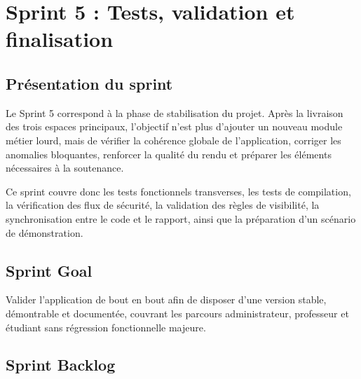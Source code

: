 \documentclass[12pt,a4paper]{report}
\begin{document}
\chapter{Sprint 5 : Tests, validation et finalisation}

\section{Présentation du sprint}

Le Sprint 5 correspond à la phase de stabilisation du projet. Après la livraison des trois espaces principaux, l'objectif n'est plus d'ajouter un nouveau module métier lourd, mais de vérifier la cohérence globale de l'application, corriger les anomalies bloquantes, renforcer la qualité du rendu et préparer les éléments nécessaires à la soutenance.

Ce sprint couvre donc les tests fonctionnels transverses, les tests de compilation, la vérification des flux de sécurité, la validation des règles de visibilité, la synchronisation entre le code et le rapport, ainsi que la préparation d'un scénario de démonstration.

\section{Sprint Goal}

Valider l'application de bout en bout afin de disposer d'une version stable, démontrable et documentée, couvrant les parcours administrateur, professeur et étudiant sans régression fonctionnelle majeure.

\section{Sprint Backlog}
\end{document}
